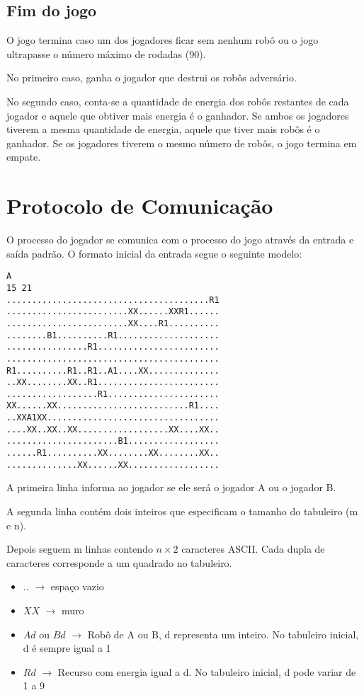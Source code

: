 \documentclass[11pt]{article}
\begin{document}
\subsection{Fim do jogo}
O jogo termina caso um dos jogadores ficar sem nenhum robô ou o jogo ultrapasse o número máximo de rodadas (90).

No primeiro caso, ganha o jogador que destrui os robôs adversário.

No segundo caso, conta-se a quantidade de energia dos robôs restantes de cada jogador e aquele que obtiver mais energia é o ganhador. Se ambos os jogadores tiverem a mesma quantidade de energia, aquele que tiver mais robôs é o ganhador. Se os jogadores tiverem o mesmo número de robôs, o jogo termina em empate.

\section{Protocolo de Comunicação}

O processo do jogador se comunica com o processo do jogo através da entrada e saída padrão. O formato inicial da entrada segue o seguinte modelo:
\begin{verbatim}
A
15 21
........................................R1
........................XX......XXR1......
........................XX....R1..........
........B1..........R1....................
................R1........................
..........................................
R1..........R1..R1..A1....XX..............
..XX........XX..R1........................
..................R1......................
XX......XX..........................R1....
..XXA1XX..................................
....XX..XX..XX..................XX....XX..
......................B1..................
......R1..........XX........XX........XX..
..............XX......XX..................
\end{verbatim}

A primeira linha informa ao jogador se ele será o jogador A ou o jogador B.

A segunda linha contém dois inteiros que especificam o tamanho do tabuleiro (m e n).

Depois seguem m linhas contendo $n \times 2$ caracteres ASCII. Cada dupla de caracteres corresponde a um quadrado no tabuleiro.

\begin{itemize}
\item{$..$ $\rightarrow$ espaço vazio}
\item{$XX$ $\rightarrow$ muro}
\item{$Ad$ ou $Bd$ $\rightarrow$ Robô de A ou B, d representa um inteiro. No tabuleiro inicial, d é sempre igual a 1 }
\item{$Rd$ $\rightarrow$ Recurso com energia igual a d. No tabuleiro inicial, d pode variar de 1 a 9}
\end{itemize}
\end{document}
